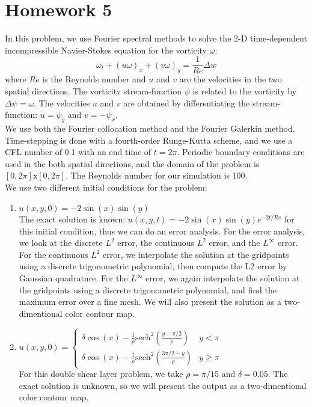 \documentclass[12pt]{article}
\begin{document}
\section*{Homework 5}In this problem, we use Fourier spectral methods to solve the 2-D time-dependent incompressible Navier-Stokes equation for the vorticity $\omega$:
\[
\omega_t + (u \omega)_x + (v \omega)_y = \frac{1}{Re} \Delta w
\]
where $Re$ is the Reynolds number and $u$ and $v$ are the velocities in the two spatial directions. The vorticity stream-function $\psi$ is related to the vorticity by $\Delta \psi = \omega$. The velocities $u$ and $v$ are obtained by differentiating the stream-function: $u = \psi_y$ and $v = -\psi_x$. \\

We use both the Fourier collocation method and the Fourier Galerkin method. Time-stepping is done with a fourth-order Runge-Kutta scheme, and we use a CFL number of 0.1 with an end time of $t = 2 \pi$. Periodic boundary conditions are used in the both spatial directions, and the domain of the problem is $[0, 2 \pi] \textrm{x} [0, 2 \pi]$. The Reynolds number for our simulation is 100.  \\

We use two different initial conditions for the problem:
\begin{enumerate}
	\item $u(x, y, 0) = -2 \sin(x) \sin(y) $\\

	The exact solution is known: $u(x, y, t) = -2 \sin(x) \sin(y) e^{- 2 t/{Re}}$ for this initial condition, thus we can do an error analysis. For the error analysis, we look at the discrete $L^2$ error, the continuous $L^2$ error, and the $L^\infty$ error. For the continuous $L^2$ error, we interpolate the solution at the gridpoints using a discrete trigonometric polynomial, then compute the L2 error by Gaussian quadrature. For the $L^\infty$ error, we again interpolate the solution at the gridpoints using a discrete trigonometric polynomial, and find the maximum error over a fine mesh. We will also present the solution as a two-dimentional color contour map.
	\item $u(x, y, 0) = \begin{cases}
			\delta \cos(x) - \frac{1}{\rho} \textrm{sech}^2\left(\frac{y - \pi/2}{\rho}\right) & y < \pi \\
			\delta \cos(x) - \frac{1}{\rho} \textrm{sech}^2\left(\frac{3 \pi/2 - y}{\rho}\right) & y \geq \pi
	\end{cases}$\\

	For this double shear layer problem, we take $\rho = \pi/15$ and $\delta = 0.05$. The exact solution is unknown, so we will present the output as a two-dimentional color contour map.
\end{enumerate}
\end{document}

